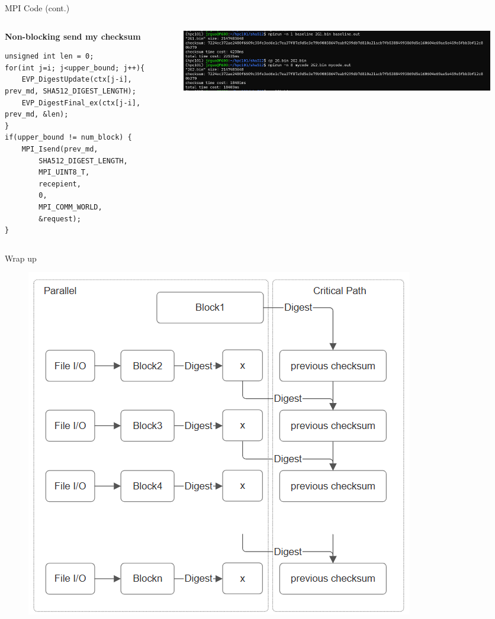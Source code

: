 \begin{frame}[fragile]{MPI Code (cont.)}
    \begin{columns}
    \begin{column}{.45\textwidth}
        \textbf{\scriptsize Non-blocking send my checksum}
        \begin{verbatim}
unsigned int len = 0;
for(int j=i; j<upper_bound; j++){
    EVP_DigestUpdate(ctx[j-i], prev_md, SHA512_DIGEST_LENGTH);
    EVP_DigestFinal_ex(ctx[j-i], prev_md, &len);
}
if(upper_bound != num_block) {
    MPI_Isend(prev_md,
        SHA512_DIGEST_LENGTH,
        MPI_UINT8_T,
        recepient,
        0,
        MPI_COMM_WORLD,
        &request);
}
              \end{verbatim}
        \end{column}
        
        \begin{column}{.55\textwidth}
        \begin{figure}
            \centering
            \includegraphics[width=1.0\linewidth]{day8_am/img/mpi/speedup.png}
        \end{figure}

        \vspace{0.5cm}

        \end{column}
        
    \end{columns}
    
\end{frame}

\begin{frame}{Wrap up}
    \begin{figure}
            \centering
            \includegraphics[width=0.45\linewidth]{day8_am/img/mpi/SHA512para.png}
    \end{figure}
\end{frame}
